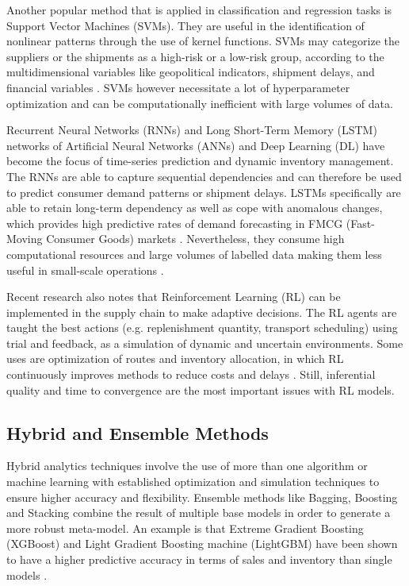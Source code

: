 Another popular method that is applied in classification and regression tasks is Support Vector Machines (SVMs). They are useful in the identification of nonlinear patterns through the use of kernel functions. SVMs may categorize the suppliers or the shipments as a high-risk or a low-risk group, according to the multidimensional variables like geopolitical indicators, shipment delays, and financial variables \autocite{zhao_study_2021}. SVMs however necessitate a lot of hyperparameter optimization and can be computationally inefficient with large volumes of data.

Recurrent Neural Networks (RNNs) and Long Short-Term Memory (LSTM) networks of Artificial Neural Networks (ANNs) and Deep Learning (DL) have become the focus of time-series prediction and dynamic inventory management. The RNNs are able to capture sequential dependencies and can therefore be used to predict consumer demand patterns or shipment delays. LSTMs specifically are able to retain long-term dependency as well as cope with anomalous changes, which provides high predictive rates of demand forecasting in FMCG (Fast-Moving Consumer Goods) markets \autocite{yu2023}. Nevertheless, they consume high computational resources and large volumes of labelled data making them less useful in small-scale operations \autocite{NA2024313, LIU2024}.

Recent research also notes that Reinforcement Learning (RL) can be implemented in the supply chain to make adaptive decisions. The RL agents are taught the best actions (e.g. replenishment quantity, transport scheduling) using trial and feedback, as a simulation of dynamic and uncertain environments. Some uses are optimization of routes and inventory allocation, in which RL continuously improves methods to reduce costs and delays \autocite{chowdhury2025systematic}. Still, inferential quality and time to convergence are the most important issues with RL models.


\subsection{Hybrid and Ensemble Methods}

Hybrid analytics techniques involve the use of more than one algorithm or machine learning with established optimization and simulation techniques to ensure higher accuracy and flexibility. Ensemble methods like Bagging, Boosting and Stacking combine the result of multiple base models in order to generate a more robust meta-model. An example is that Extreme Gradient Boosting (XGBoost) and Light Gradient Boosting machine (LightGBM) have been shown to have a higher predictive accuracy in terms of sales and inventory than single models \autocite{ke2017lightgbm}.

